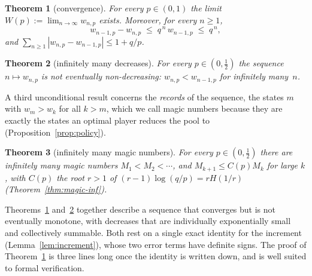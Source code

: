 \documentclass[11pt]{article}
\newtheorem{theorem}{Theorem}[section]
\theoremstyle{definition}
\begin{document}
\begin{theorem}[convergence]\label{thm:conv}
  For every $p\in(0,1)$ the limit $W(p):=\lim_{n\to\infty}w_{n,p}$
  exists.  Moreover, for every $n\ge1$,
  \begin{equation}\label{eq:dipbound}
    w_{n-1,p}-w_{n,p}\;\le\;q^{\,n}\,w_{n-1,p}\;\le\;q^{\,n},
  \end{equation}
  and $\sum_{n\ge1}|w_{n,p}-w_{n-1,p}|\le 1+q/p$.
\end{theorem}

\begin{theorem}[infinitely many decreases]\label{thm:dips}
  For every $p\in(0,\tfrac12)$ the sequence $n\mapsto w_{n,p}$ is not
  eventually non-decreasing: $w_{n,p}<w_{n-1,p}$ for infinitely
  many~$n$.
\end{theorem}

A third unconditional result concerns the \emph{records} of the
sequence, the states $m$ with $w_m>w_k$ for all $k>m$, which we call
magic numbers because they are exactly the states an optimal player
reduces the pool to (Proposition~\ref{prop:policy}).

\begin{theorem}[infinitely many magic numbers]\label{thm:magic-inf-intro}
  For every $p\in(0,\tfrac12)$ there are infinitely many magic numbers
  $M_1<M_2<\cdots$, and $M_{k+1}\le C(p)M_k$ for large $k$, with
  $C(p)$ the root $r>1$ of $(r-1)\log(q/p)=rH(1/r)$
  (Theorem~\ref{thm:magic-inf}).
\end{theorem}

Theorems~\ref{thm:conv} and~\ref{thm:dips} together describe a
sequence that converges but is not eventually monotone, with
decreases that are individually exponentially small and collectively
summable.  Both rest on a single exact identity for the increment
(Lemma~\ref{lem:increment}), whose two error terms have definite
signs.  The proof of Theorem~\ref{thm:conv} is three lines long once
the identity is written down, and is well suited to formal
verification.
\end{document}
